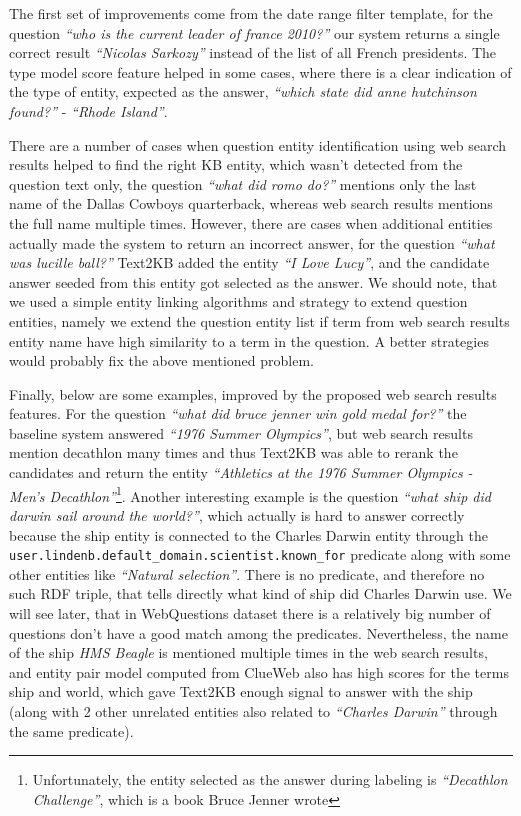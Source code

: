 The first set of improvements come from the date range filter template, \eg for the question \textit{``who is the current leader of france 2010?''} our system returns a single correct result \textit{``Nicolas Sarkozy''} instead of the list of all French presidents.
The type model score feature helped in some cases, where there is a clear indication of the type of entity, expected as the answer, \eg \textit{``which state did anne hutchinson found?''} - \textit{``Rhode Island''}.

There are a number of cases when question entity identification using web search results helped to find the right KB entity, which wasn't detected from the question text only, \eg the question \textit{``what did romo do?''} mentions only the last name of the Dallas Cowboys quarterback, whereas web search results mentions the full name multiple times.
However, there are cases when additional entities actually made the system to return an incorrect answer, \eg for the question \textit{``what was lucille ball?''} Text2KB added the entity \textit{``I Love Lucy''}, and the candidate answer seeded from this entity got selected as the answer.
We should note, that we used a simple entity linking algorithms and strategy to extend question entities, namely we extend the question entity list if term from web search results entity name have high similarity to a term in the question.
A better strategies would probably fix the above mentioned problem.

Finally, below are some examples, improved by the proposed web search results features.
For the question \textit{``what did bruce jenner win gold medal for?''} the baseline system answered \textit{``1976 Summer Olympics''}, but web search results mention decathlon many times and thus Text2KB was able to rerank the candidates and return the entity \textit{``Athletics at the 1976 Summer Olympics - Men's Decathlon''}\footnote{Unfortunately, the entity selected as the answer during labeling is \textit{``Decathlon Challenge''}, which is a book Bruce Jenner wrote}.
Another interesting example is the question \textit{``what ship did darwin sail around the world?''}, which actually is hard to answer correctly because the ship entity is connected to the Charles Darwin entity through the \texttt{user.lindenb.default\_domain.scientist.known\_for} predicate along with some other entities like \textit{``Natural selection''}.
There is no predicate, and therefore no such RDF triple, that tells directly what kind of ship did Charles Darwin use.
We will see later, that in WebQuestions dataset there is a relatively big number of questions don't have a good match among the predicates.
Nevertheless, the name of the ship \textit{HMS Beagle} is mentioned multiple times in the web search results, and entity pair model computed from ClueWeb also has high scores for the terms ship and world, which gave Text2KB enough signal to answer with the ship (along with 2 other unrelated entities also related to \textit{``Charles Darwin''} through the same predicate).

